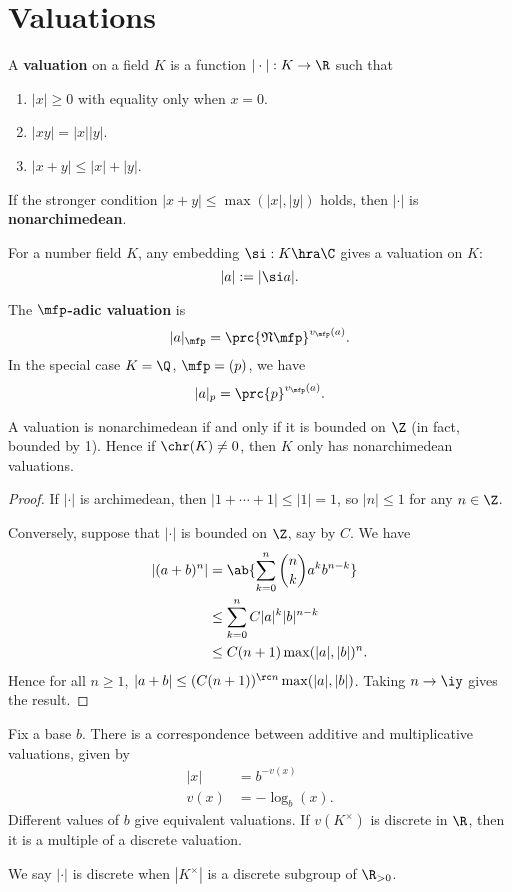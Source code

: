 \section{Valuations}
\begin{df}
A \textbf{valuation} on a field $K$ is a function $|\cdot |:K\to \R$ such that
\begin{enumerate}
\item
$|x|\ge 0$ with equality only when $x=0$.
\item
$|xy|=|x||y|$.
\item
$|x+y|\le |x|+|y|$.
\end{enumerate}
If the stronger condition $|x+y|\le \max(|x|,|y|)$ holds, then $|\cdot|$ is \textbf{nonarchimedean}.
\end{df}
\begin{ex}
For a number field $K$, any embedding $\si:K\hra \C$ gives a valuation on $K$:
\[|a|:=|\si a|.\]
\end{ex}
\begin{ex}
The \textbf{$\mfp$-adic valuation} is
\[
|a|_{\mfp}=\prc{\mathfrak N \mfp}^{v_{\mfp}(a)}.
\]
In the special case $K=\Q$, $\mfp=(p)$, we have
\[
|a|_p=\prc{p}^{v_{\mfp}(a)}.
\]
\end{ex}
\begin{pr}
A valuation is nonarchimedean if and only if it is bounded on $\Z$ (in fact, bounded by 1). Hence if $\chr(K)\ne 0$, then $K$ only has nonarchimedean valuations.
\end{pr}
\begin{proof}
If $|\cdot|$ is archimedean, then $|1+\cdots +1|\le |1|=1$, so $|n|\le 1$ for any $n\in \Z$.

Conversely, suppose that $|\cdot |$ is bounded on $\Z$, say by $C$. We have
\begin{align*}
|(a+b)^n|&=\ab{\sum_{k=0}^n \binom nk a^kb^{n-k}}\\
&\le \sum_{k=0}^n C |a|^k|b|^{n-k}\\
&\le C(n+1)\max(|a|,|b|)^n.
\end{align*}
Hence for all $n\ge 1$, $|a+b|\le (C(n+1))^{\rc n}\max(|a|,|b|)$. Taking $n\to \iy$ gives the result.
\end{proof}
\begin{pr}
Fix a base $b$. There is a correspondence between additive and multiplicative valuations, given by
\begin{align*}
|x|&=b^{-v(x)}\\
v(x)&=-\log_b(x).
\end{align*}
Different values of $b$ give equivalent valuations. If $v(K^{\times})$ is discrete in $\R$, then it is a multiple of a discrete valuation.
\end{pr}
We say $|\cdot|$ is discrete when $|K^{\times}|$ is a discrete subgroup of $\R_{>0}$.

